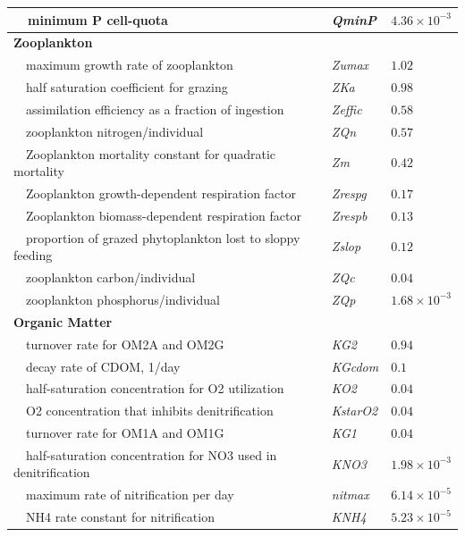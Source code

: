\documentclass[letterpaper,12pt,oneside]{article}\usepackage[]{graphicx}\usepackage[]{color}
\begin{document}
\begin{table}[!tbp]
{\begin{center}
\begin{tabular}{lll}
~~minimum P cell-quota&\textit{QminP}&$4.36\times 10^{-3}$\tabularnewline
\hline
{\bfseries Zooplankton}&&\tabularnewline
~~maximum growth rate of zooplankton&\textit{Zumax}&$1.02$\tabularnewline
~~half saturation coefficient for grazing&\textit{ZKa}&$0.98$\tabularnewline
~~assimilation efficiency as a fraction of ingestion&\textit{Zeffic}&$0.58$\tabularnewline
~~zooplankton nitrogen/individual&\textit{ZQn}&$0.57$\tabularnewline
~~Zooplankton mortality constant for quadratic mortality&\textit{Zm}&$0.42$\tabularnewline
~~Zooplankton growth-dependent respiration factor&\textit{Zrespg}&$0.17$\tabularnewline
~~Zooplankton biomass-dependent respiration factor&\textit{Zrespb}&$0.13$\tabularnewline
~~proportion of grazed phytoplankton lost to sloppy feeding&\textit{Zslop}&$0.12$\tabularnewline
~~zooplankton carbon/individual&\textit{ZQc}&$0.04$\tabularnewline
~~zooplankton phosphorus/individual&\textit{ZQp}&$1.68\times 10^{-3}$\tabularnewline
\hline
{\bfseries Organic Matter}&&\tabularnewline
~~turnover rate for OM2A and OM2G&\textit{KG2}&$0.94$\tabularnewline
~~decay rate of CDOM, 1/day&\textit{KGcdom}&$0.1$\tabularnewline
~~half-saturation concentration for O2 utilization&\textit{KO2}&$0.04$\tabularnewline
~~O2 concentration that inhibits denitrification&\textit{KstarO2}&$0.04$\tabularnewline
~~turnover rate for OM1A and OM1G&\textit{KG1}&$0.04$\tabularnewline
~~half-saturation concentration for NO3 used in denitrification&\textit{KNO3}&$1.98\times 10^{-3}$\tabularnewline
~~maximum rate of nitrification per day&\textit{nitmax}&$6.14\times 10^{-5}$\tabularnewline
~~NH4 rate constant for nitrification&\textit{KNH4}&$5.23\times 10^{-5}$\tabularnewline
\hline
\end{tabular}\end{center}}

\end{table}
\end{document}
